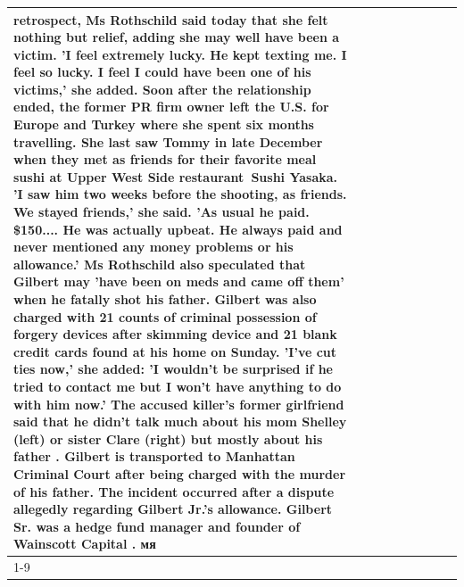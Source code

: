 \begin{table}[H]
\begin{tabular}{lllrlllll}
retrospect, Ms Rothschild said today that she felt nothing but relief, adding she may well have been a victim. 'I feel extremely lucky. He kept texting me. I feel so lucky. I feel I could have been one of his victims,' she added. Soon after the relationship ended, the former PR firm owner left the U.S. for Europe and Turkey where she spent six months  travelling. She last saw Tommy in late December when they met as friends for their favorite meal sushi at Upper West Side restaurant Sushi Yasaka. 'I saw him two weeks before the shooting, as friends. We stayed friends,' she said. 'As usual he paid. \$150.... He was actually upbeat. He always paid and never mentioned any money problems or his allowance.' Ms Rothschild also speculated that Gilbert may 'have been on meds and came off them' when he fatally shot his father. Gilbert was also charged with 21 counts of criminal possession of forgery devices after skimming device and 21 blank credit cards found at his home on Sunday. 'I've cut ties now,' she added: 'I wouldn’t be surprised if he tried to contact me but I won’t have anything to do with him now.' The accused killer's former girlfriend said that he didn't talk much about his mom Shelley (left) or sister Clare (right) but mostly about his father . Gilbert is transported to Manhattan Criminal Court  after being charged with the murder of his father. The incident occurred after a dispute allegedly regarding Gilbert Jr.'s allowance. Gilbert Sr. was a hedge fund manager and founder of Wainscott Capital . мя \\
\cline{1-9}

\end{tabular}
\end{table}
